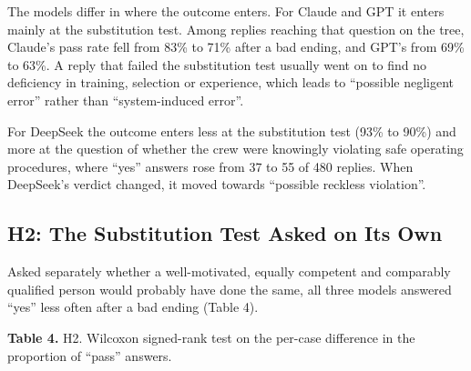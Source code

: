 \documentclass{aer}
\begin{document}
The models differ in where the outcome enters. For Claude and GPT it enters mainly at the substitution test. Among replies reaching that question on the tree, Claude's pass rate fell from 83\% to 71\% after a bad ending, and GPT's from 69\% to 63\%. A reply that failed the substitution test usually went on to find no deficiency in training, selection or experience, which leads to ``possible negligent error'' rather than ``system-induced error''.

For DeepSeek the outcome enters less at the substitution test (93\% to 90\%) and more at the question of whether the crew were knowingly violating safe operating procedures, where ``yes'' answers rose from 37 to 55 of 480 replies. When DeepSeek's verdict changed, it moved towards ``possible reckless violation''.

\hypertarget{h2-the-substitution-test-asked-on-its-own}{%
\subsection{H2: The Substitution Test Asked on Its Own}\label{h2-the-substitution-test-asked-on-its-own}}

Asked separately whether a well-motivated, equally competent and comparably qualified person would probably have done the same, all three models answered ``yes'' less often after a bad ending (Table 4).

\noindent\textbf{Table 4.} H2. Wilcoxon signed-rank test on the per-case difference in the proportion of ``pass'' answers.
\end{document}
